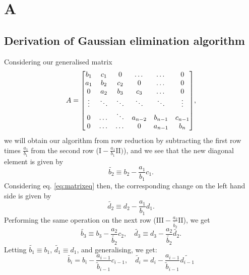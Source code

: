 \onecolumn
\section*{A}
\label{appendix}
\renewcommand{\theequation}{I\thechapter.\arabic{equation}}

\subsection*{Derivation of Gaussian elimination algorithm}
\label{sec:derivgauss}
Considering our generalised matrix
  \[A =
    \mqty[b_1 & c_1 & 0 & \dots & \dots & 0 \\
          a_1 & b_2 & c_2 & 0 & \dots & 0 \\
          0 & a_2 & b_3 & c_3 & \dots & 0 \\
          \vdots & \ddots & \ddots & \ddots & \ddots & \vdots \\
          0 & \dots & \ddots & a_{n-2} & b_{n-1} & c_{n-1} \\
          0 & \dots & \dots & 0 & a_{n-1} & b_n],
  \]
we will obtain our algorithm from row reduction by subtracting the first row
times $\frac{a_1}{b_1}$ from the second row ($\text{I} - \frac{a_1}{b_1}\text{II}
)$), and we see that the new diagonal element is given by
  \[\widetilde{b_2} \equiv b_2 - \frac{a_1}{b_1}c_1.\]
Considering eq. \ref{eq:matrixeq} then, the corresponding change on the left
hand side is given by
  \[\widetilde{d_2} \equiv d_2 - \frac{a_1}{b_1}d_1.\]
Performing the same operation on the next row
($\text{III} - \frac{a_2}{\widetilde{b_2}}\text{II}$), we get
  \[\widetilde{b_3} \equiv b_3 - \frac{a_2}{\widetilde{b_2}}c_2, \quad
  \widetilde{d_3} \equiv d_3 - \frac{a_2}{\widetilde{b_2}}\widetilde{d_2}.
  \]
Letting $\widetilde{b_1} \equiv b_1$, $\widetilde{d_1} \equiv d_1$, and
generalising, we get:
  \[\widetilde{b_i} = b_i - \frac{a_{i-1}}{\widetilde{b}_{i-1}}c_{i-1}, \quad
  \widetilde{d_i} = d_i - \frac{a_{i-1}}{\widetilde{b}_{i-1}}\widetilde{d_{i-1}}
  \]
